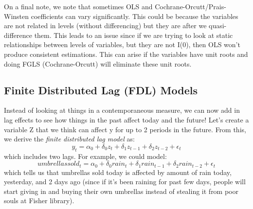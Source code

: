 \documentclass[11pt, oneside]{article}
\theoremstyle{definition}
\begin{document}
On a final note, we note that sometimes OLS and Cochrane-Orcutt/Prais-Winsten coefficients can vary significantly. This could be because the variables are not related in levels (without differencing) but they are after we quasi-difference them. This leads to an issue since if we are trying to look at static relationships between levels of variables, but they are not I(0), then OLS won't produce consistent estimations. This can arise if the variables have unit roots and doing FGLS (Cochrane-Orcutt) will eliminate these unit roots.

\subsection{Finite Distributed Lag (FDL) Models}
Instead of looking at things in a contemporaneous measure, we can now add in lag effects to see how things in the past affect today and the future! Let's create a variable Z that we think can affect y for up to 2 periods in the future. From this, we derive the \textit{finite distributed lag model} as:
$$
y_t = \alpha_0 + \delta_0 z_t + \delta_1 z_{t-1} + \delta_2 z_{t-2} + \epsilon_t
$$
which includes two lags. For example, we could model:
$$
umbrellassold_t = \alpha_0 + \delta_0 rain_t + \delta_1 rain_{t-1} + \delta_2 rain_{t-2} + \epsilon_t
$$
which tells us that umbrellas sold today is affected by amount of rain today, yesterday, and 2 days ago (since if it's been raining for past few days, people will start giving in and buying their own umbrellas instead of stealing it from poor souls at Fisher library).
\end{document}
